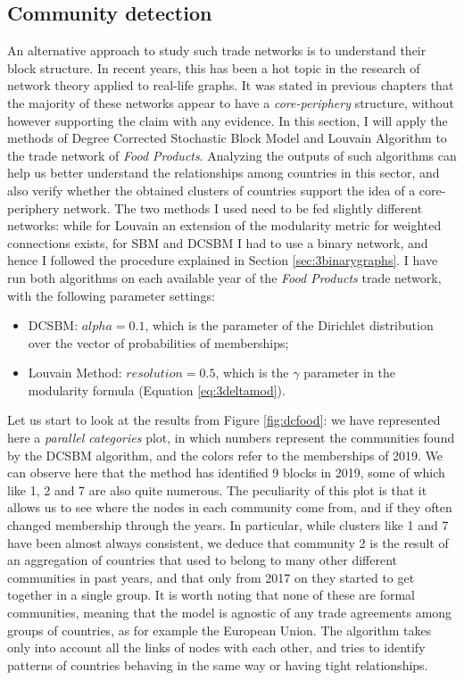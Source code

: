 \subsection{Community detection}

An alternative approach to study such trade networks is to understand their block structure. In recent years, this has been a hot topic in the research of network theory applied to real-life graphs. It was stated in previous chapters that the majority of these networks appear to have a \textit{core-periphery} structure, without however supporting the claim with any evidence. In this section, I will apply the methods of Degree Corrected Stochastic Block Model and Louvain Algorithm to the trade network of \textit{Food Products}. Analyzing the outputs of such algorithms can help us better understand the relationships among countries in this sector, and also verify whether the obtained clusters of countries support the idea of a core-periphery network. The two methods I used need to be fed slightly different networks: while for Louvain an extension of the modularity metric for weighted connections exists, for SBM and DCSBM I had to use a binary network, and hence I followed the procedure explained in Section \ref{sec:3binarygraphs}. I have run both algorithms on each available year of the \textit{Food Products} trade network, with the following parameter settings:
\begin{itemize}
    \item DCSBM: $alpha = 0.1$, which is the parameter of the Dirichlet distribution over the vector of probabilities of memberships;
    \item Louvain Method: $resolution = 0.5$, which is the $\gamma$ parameter in the modularity formula (Equation \ref{eq:3deltamod}).
\end{itemize}
Let us start to look at the results from Figure \ref{fig:dcfood}: we have represented here a \textit{parallel categories} plot, in which numbers represent the communities found by the DCSBM algorithm, and the colors refer to the memberships of 2019. We can observe here that the method has identified 9 blocks in 2019, some of which like 1, 2 and 7 are also quite numerous. The peculiarity of this plot is that it allows us to see where the nodes in each community come from, and if they often changed membership through the years. In particular, while clusters like 1 and 7 have been almost always consistent, we deduce that community 2 is the result of an aggregation of countries that used to belong to many other different communities in past years, and that only from 2017 on they started to get together in a single group. It is worth noting that none of these are formal communities, meaning that the model is agnostic of any trade agreements among groups of countries, as for example the European Union. The algorithm takes only into account all the links of nodes with each other, and tries to identify patterns of countries behaving in the same way or having tight relationships.
